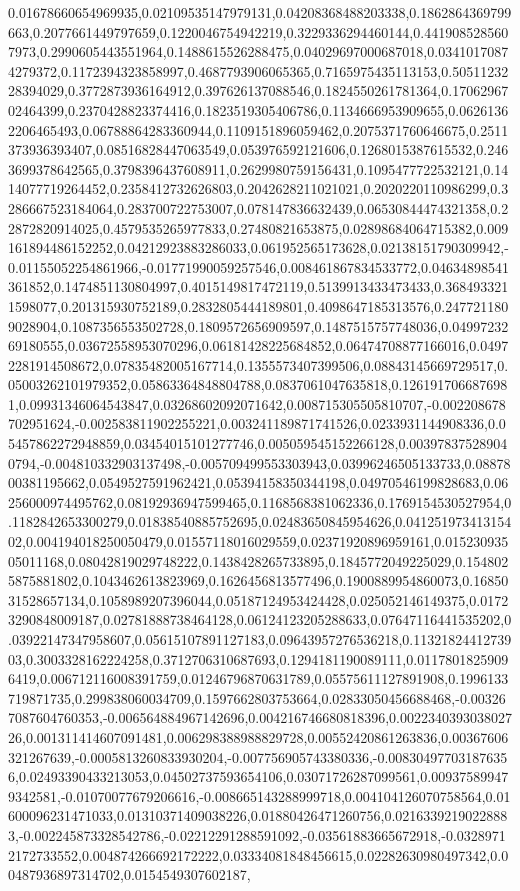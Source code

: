0.01678660654969935,0.02109535147979131,0.04208368488203338,0.1862864369799663,0.2077661449797659,0.1220046754942219,0.3229336294460144,0.4419085285607973,0.2990605443551964,0.1488615526288475,0.04029697000687018,0.03410170874279372,0.1172394323858997,0.4687793906065365,0.7165975435113153,0.5051123228394029,0.3772873936164912,0.397626137088546,0.1824550261781364,0.1706296702464399,0.2370428823374416,0.1823519305406786,0.1134666953909655,0.06261362206465493,0.06788864283360944,0.1109151896059462,0.2075371760646675,0.2511373936393407,0.08516828447063549,0.053976592121606,0.1268015387615532,0.2463699378642565,0.3798396437608911,0.2629980759156431,0.1095477722532121,0.1414077719264452,0.2358412732626803,0.2042628211021021,0.2020220110986299,0.3286667523184064,0.283700722753007,0.078147836632439,0.06530844474321358,0.22872820914025,0.4579535265977833,0.27480821653875,0.02898684064715382,0.009161894486152252,0.04212923883286033,0.061952565173628,0.02138151790309942,-0.01155052254861966,-0.01771990059257546,0.008461867834533772,0.04634898541361852,0.1474851130804997,0.4015149817472119,0.5139913433473433,0.3684933211598077,0.201315930752189,0.2832805444189801,0.4098647185313576,0.2477211809028904,0.1087356553502728,0.1809572656909597,0.1487515757748036,0.0499723269180555,0.03672558953070296,0.06181428225684852,0.06474708877166016,0.04972281914508672,0.07835482005167714,0.1355573407399506,0.08843145669729517,0.05003262101979352,0.05863364848804788,0.0837061047635818,0.1261917066876981,0.09931346064543847,0.03268602092071642,0.008715305505810707,-0.002208678702951624,-0.002583811902255221,0.003241189871741526,0.0233931144908336,0.05457862272948859,0.03454015101277746,0.005059545152266128,0.003978375289040794,-0.004810332903137498,-0.005709499553303943,0.03996246505133733,0.0887800381195662,0.0549527591962421,0.05394158350344198,0.04970546199828683,0.06256000974495762,0.08192936947599465,0.1168568381062336,0.1769154530527954,0.1182842653300279,0.01838540885752695,0.02483650845954626,0.04125197341315402,0.004194018250050479,0.01557118016029559,0.02371920896959161,0.01523093505011168,0.08042819029748222,0.1438428265733895,0.1845772049225029,0.1548025875881802,0.1043462613823969,0.1626456813577496,0.1900889954860073,0.1685031528657134,0.1058989207396044,0.05187124953424428,0.025052146149375,0.01723290848009187,0.02781888738464128,0.06124123205288633,0.07647116441535202,0.03922147347958607,0.05615107891127183,0.09643957276536218,0.1132182441273903,0.3003328162224258,0.3712706310687693,0.1294181190089111,0.01178018259096419,0.006712116008391759,0.01246796870631789,0.05575611127891908,0.1996133719871735,0.299838060034709,0.1597662803753664,0.02833050456688468,-0.003267087604760353,-0.006564884967142696,0.004216746680818396,0.002234039303802726,0.001311414607091481,0.006298388988829728,0.00552420861263836,0.00367606321267639,-0.0005813260833930204,-0.007756905743380336,-0.008304977031876356,0.02493390433213053,0.04502737593654106,0.03071726287099561,0.009375899479342581,-0.01070077679206616,-0.008665143288999718,0.004104126070758564,0.01600096231471033,0.01310371409038226,0.01880426471260756,0.02163392190228883,-0.002245873328542786,-0.02212291288591092,-0.03561883665672918,-0.03289712172733552,0.004874266692172222,0.03334081848456615,0.02282630980497342,0.00487936897314702,0.0154549307602187,